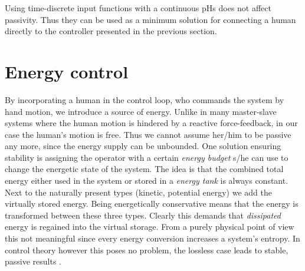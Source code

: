 \documentclass[a4paper,twoside, openright,12pt]{report}
\begin{document}
Using time-discrete input functions with a continuous pHs does not affect passivity. Thus they can be used as a minimum solution for connecting a human directly to the controller presented in the previous section.



\section{Energy control}
By incorporating a human in the control loop, who commands the system by hand motion, we introduce a source of energy. Unlike in many master-slave systems where the human motion is hindered by a reactive force-feedback, in our case the human's motion is free. Thus we cannot assume her/him to be passive any more, since the energy supply can be unbounded. One solution ensuring stability is assigning the operator with a certain \emph{energy budget} s/he can use to change the energetic state of the system. The idea is that the combined total energy either used in the system or stored in a \emph{energy tank} is always constant. Next to the naturally present types (kinetic, potential energy) we add the virtually stored energy. Being energetically conservative means that the energy is transformed between these three types. Clearly this demands that \emph{dissipated} energy is regained into the virtual storage. From a purely physical point of view this not meaningful since every energy conversion increases a system's entropy. In control theory however this poses no problem, the lossless case leads to stable, passive results \cite{Stramigioli_15}.
\end{document}
